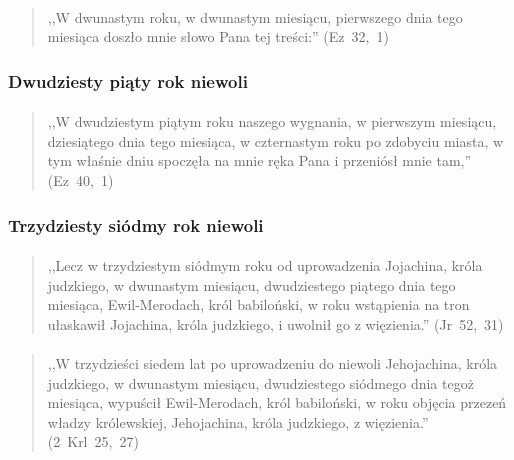 \documentclass[10pt,a4paper,oneside]{article}
\begin{document}
\paragraph{}
\begin{quote}
,,W dwunastym roku, w dwunastym miesiącu, pierwszego dnia tego miesiąca doszło mnie słowo Pana tej treści:'' \mbox{(Ez 32, 1)}
\end{quote}
\subsubsection{Dwudziesty piąty rok niewoli}
\paragraph{}
\begin{quote}
,,W dwudziestym piątym roku naszego wygnania, w pierwszym miesiącu, dziesiątego dnia tego miesiąca, w czternastym roku po zdobyciu miasta, w tym właśnie dniu spoczęła na mnie ręka Pana i przeniósł mnie tam,'' \mbox{(Ez 40, 1)}
\end{quote}
\subsubsection{Trzydziesty siódmy rok niewoli}
\paragraph{}
\begin{quote}
,,Lecz w trzydziestym siódmym roku od uprowadzenia Jojachina, króla judzkiego, w dwunastym miesiącu, dwudziestego piątego dnia tego miesiąca, Ewil-Merodach, król babiloński, w roku wstąpienia na tron ułaskawił Jojachina, króla judzkiego, i uwolnił go z więzienia.'' \mbox{(Jr 52, 31)}
\end{quote}
\paragraph{}
\begin{quote}
,,W trzydzieści siedem lat po uprowadzeniu do niewoli Jehojachina, króla judzkiego, w dwunastym miesiącu, dwudziestego siódmego dnia tegoż miesiąca, wypuścił Ewil-Merodach, król babiloński, w roku objęcia przezeń władzy królewskiej, Jehojachina, króla judzkiego, z więzienia.'' \mbox{(2 Krl 25, 27)}
\end{quote}
\end{document}
